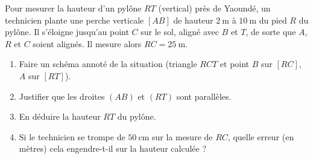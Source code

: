 \documentclass[11pt]{article}
\begin{document}
\begin{exercice}
Pour mesurer la hauteur d'un pylône $RT$ (vertical) près de Yaoundé, un technicien plante une perche verticale $[AB]$ de hauteur $\SI{2}{\meter}$ à $\SI{10}{\meter}$ du pied $R$ du pylône. Il s'éloigne jusqu'au point $C$ sur le sol, aligné avec $B$ et $T$, de sorte que $A$, $R$ et $C$ soient alignés. Il mesure alors $RC = \SI{25}{\meter}$.
\begin{enumerate}
    \item Faire un schéma annoté de la situation (triangle $RCT$ et point $B$ sur $[RC]$, $A$ sur $[RT]$).
    \item Justifier que les droites $(AB)$ et $(RT)$ sont parallèles.
    \item En déduire la hauteur $RT$ du pylône.
    \item Si le technicien se trompe de $\SI{50}{\centi\meter}$ sur la mesure de $RC$, quelle erreur (en mètres) cela engendre-t-il sur la hauteur calculée ?
\end{enumerate}
\end{exercice}
\end{document}
